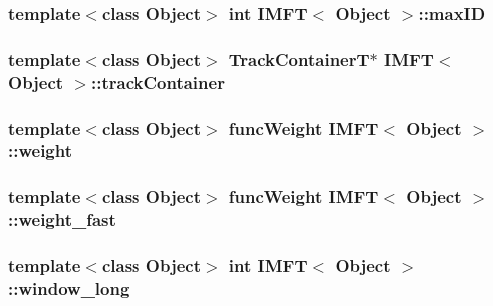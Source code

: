 \hypertarget{class_i_m_f_t_abb14e14b1278312f13d5e45bb0bedd47}{
\subsubsection[{max\-I\-D}]{\setlength{\rightskip}{0pt plus 5cm}template$<$class \-Object$>$ int {\bf \-I\-M\-F\-T}$<$ \-Object $>$\-::{\bf max\-I\-D}}}\label{class_i_m_f_t_abb14e14b1278312f13d5e45bb0bedd47}
\hypertarget{class_i_m_f_t_a2b7798fca0fac14339c47ce517778560}{
\subsubsection[{track\-Container}]{\setlength{\rightskip}{0pt plus 5cm}template$<$class \-Object$>$ {\bf \-Track\-Container\-T}$\ast$ {\bf \-I\-M\-F\-T}$<$ \-Object $>$\-::{\bf track\-Container}}}\label{class_i_m_f_t_a2b7798fca0fac14339c47ce517778560}
\hypertarget{class_i_m_f_t_ac25f8710b5133e975dd7be2e9909f0bd}{
\subsubsection[{weight}]{\setlength{\rightskip}{0pt plus 5cm}template$<$class \-Object$>$ {\bf func\-Weight} {\bf \-I\-M\-F\-T}$<$ \-Object $>$\-::{\bf weight}}}\label{class_i_m_f_t_ac25f8710b5133e975dd7be2e9909f0bd}
\hypertarget{class_i_m_f_t_a9431008dbf21f96477c515c41b77014f}{
\subsubsection[{weight\-\_\-fast}]{\setlength{\rightskip}{0pt plus 5cm}template$<$class \-Object$>$ {\bf func\-Weight} {\bf \-I\-M\-F\-T}$<$ \-Object $>$\-::{\bf weight\-\_\-fast}}}\label{class_i_m_f_t_a9431008dbf21f96477c515c41b77014f}
\hypertarget{class_i_m_f_t_a90e2ffc6a77b2b27035c8dfc6cbb8378}{
\subsubsection[{window\-\_\-long}]{\setlength{\rightskip}{0pt plus 5cm}template$<$class \-Object$>$ int {\bf \-I\-M\-F\-T}$<$ \-Object $>$\-::{\bf window\-\_\-long}}}\label{class_i_m_f_t_a90e2ffc6a77b2b27035c8dfc6cbb8378}
